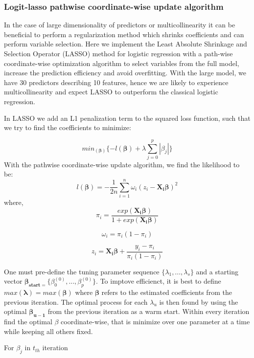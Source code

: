 \documentclass[]{article}
\begin{document}
\hypertarget{logit-lasso-pathwise-coordinate-wise-update-algorithm}{%
\subsubsection{Logit-lasso pathwise coordinate-wise update
algorithm}\label{logit-lasso-pathwise-coordinate-wise-update-algorithm}}

In the case of large dimensionality of predictors or multicollinearity
it can be beneficial to perform a regularization method which shrinks
coefficients and can perform variable selection. Here we implement the
Least Absolute Shrinkage and Selection Operator (LASSO) method for
logistic regression with a path-wise coordinate-wise optimization
algorithm to select variables from the full model, increase the
prediction efficiency and avoid overfitting. With the large model, we
have 30 predictors describing 10 features, hence we are likely to
experience multicollinearity and expect LASSO to outperform the
classical logistic regression.

In LASSO we add an L1 penalization term to the squared loss function,
such that we try to find the coefficients to minimize:

\[min _{(\boldsymbol \beta)}\{-l({\boldsymbol \beta})+\lambda\sum_{j=0}^{p}|\beta_j| \}\]
With the pathwise coordinate-wise update algorithm, we find the
likelihood to be:
\[l({\boldsymbol \beta}) = -\frac{1}{2n}\sum_{i=1}^{n}\omega_i(z_i-{\boldsymbol {X_i\beta}})^2\]
where,
\[\pi_i = \frac{exp({\boldsymbol {X_i\beta}})}{1+exp({\boldsymbol {X_i\beta}})}\]

\[\omega_i = \pi_i(1-\pi_i)\]

\[z_i = {\boldsymbol {X_i\beta}}+\frac{y_i-\pi_i}{\pi_i(1-\pi_i)}\]

One must pre-define the tuning parameter sequence
\(\{\lambda_1,...,\lambda_s\}\) and a starting vector
\({\boldsymbol{\beta_{start=}}}\{\beta_0^{(0)},...,\beta_p^{(0)}\}\). To
imptove efficienct, it is best to define
\(max{(\boldsymbol \lambda)} = max(\boldsymbol\beta)\) where
\(\boldsymbol\beta\) refers to the estimated coefficients from the
previous iteration. The optimal process for each \(\lambda_u\) is then
found by using the optimal \(\boldsymbol {\beta_{u-1}}\) from the
previous iteration as a warm start. Within every iteration find the
optimal \(\beta\) coordinate-wise, that is minimize over one parameter
at a time while keeping all others fixed.

For \(\beta_j\) in \(t_{th}\) iteration
\end{document}
